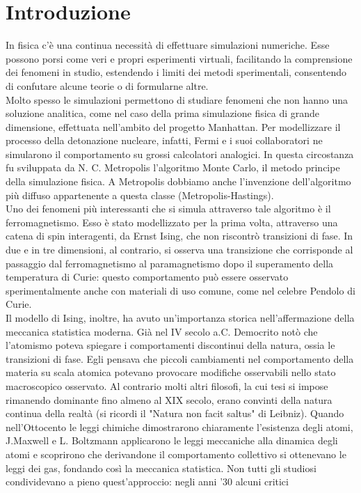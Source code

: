 \documentclass[Lau, noexaminfo, oneside]{sapthesis} %
\begin{document}
\chapter{Introduzione}
In fisica c'è una continua necessità di effettuare simulazioni numeriche. Esse possono porsi come veri e propri esperimenti virtuali, facilitando la comprensione dei fenomeni in studio, estendendo i limiti dei metodi sperimentali, consentendo di confutare alcune teorie o di formularne altre. \\
Molto spesso le simulazioni permettono di studiare fenomeni che non hanno una soluzione analitica, come nel caso della prima simulazione fisica di grande dimensione, effettuata nell'ambito del progetto Manhattan. Per modellizzare il processo della detonazione nucleare, infatti, Fermi e i suoi collaboratori ne simularono il comportamento su grossi calcolatori analogici. In questa circostanza fu sviluppata da N. C. Metropolis l'algoritmo Monte Carlo, il metodo principe della simulazione fisica. A Metropolis dobbiamo anche l'invenzione dell'algoritmo più diffuso appartenente a questa classe (Metropolis-Hastings).\\
Uno dei fenomeni più interessanti che si simula attraverso tale algoritmo è il ferromagnetismo. Esso è stato modellizzato per la prima volta, attraverso una catena di spin interagenti, da Ernst Ising, che non riscontrò transizioni di fase. In due e in tre dimensioni, al contrario, si osserva una transizione che corrisponde al passaggio dal ferromagnetismo al paramagnetismo dopo il superamento della temperatura di Curie: questo comportamento può essere osservato sperimentalmente anche con materiali di uso comune, come nel celebre Pendolo di Curie. \\
Il modello di Ising, inoltre, ha avuto un'importanza storica nell'affermazione della meccanica statistica moderna.
Già nel IV secolo a.C. Democrito notò che l'atomismo poteva spiegare i comportamenti discontinui della natura, ossia le transizioni di fase. Egli pensava che piccoli cambiamenti nel comportamento della materia su scala atomica potevano provocare modifiche osservabili nello stato macroscopico osservato. 
Al contrario molti altri filosofi, la cui tesi si impose rimanendo dominante fino almeno al XIX secolo, erano convinti della natura continua della realtà (si ricordi il "Natura non facit saltus" di Leibniz).
Quando nell'Ottocento le leggi chimiche dimostrarono chiaramente l'esistenza degli atomi, J.Maxwell e L. Boltzmann applicarono le leggi meccaniche alla dinamica degli atomi e scoprirono che derivandone il comportamento collettivo si ottenevano le leggi dei gas, fondando così la meccanica statistica. Non tutti gli studiosi condividevano a pieno quest'approccio: negli anni '30 alcuni critici
\end{document}
